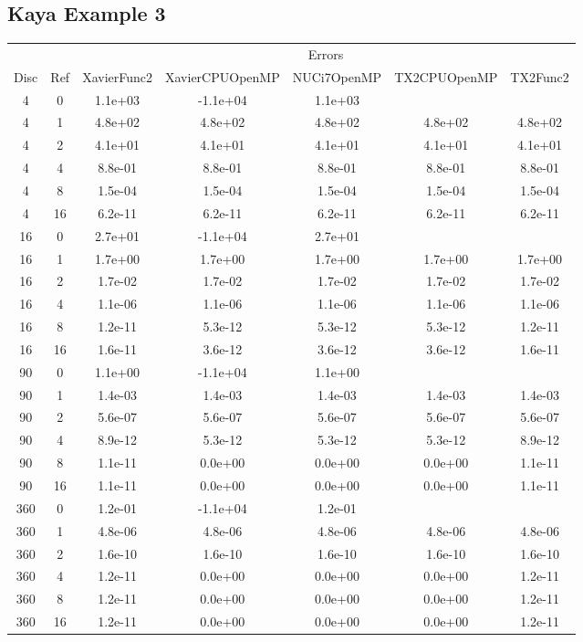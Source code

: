 \subsection{Kaya Example 3}
\begin{center}
\begin{tabular}{c|c|c|c|c|c|c}
	&&\multicolumn{5}{c}{Errors}\\
	Disc&Ref&XavierFunc2&XavierCPUOpenMP&NUCi7OpenMP&TX2CPUOpenMP&TX2Func2\\
\hline
4&0&1.1e+03&-1.1e+04&1.1e+03\\
4&1&4.8e+02&4.8e+02&4.8e+02&4.8e+02&4.8e+02\\
4&2&4.1e+01&4.1e+01&4.1e+01&4.1e+01&4.1e+01\\
4&4&8.8e-01&8.8e-01&8.8e-01&8.8e-01&8.8e-01\\
4&8&1.5e-04&1.5e-04&1.5e-04&1.5e-04&1.5e-04\\
4&16&6.2e-11&6.2e-11&6.2e-11&6.2e-11&6.2e-11\\
\hline
16&0&2.7e+01&-1.1e+04&2.7e+01\\
16&1&1.7e+00&1.7e+00&1.7e+00&1.7e+00&1.7e+00\\
16&2&1.7e-02&1.7e-02&1.7e-02&1.7e-02&1.7e-02\\
16&4&1.1e-06&1.1e-06&1.1e-06&1.1e-06&1.1e-06\\
16&8&1.2e-11&5.3e-12&5.3e-12&5.3e-12&1.2e-11\\
16&16&1.6e-11&3.6e-12&3.6e-12&3.6e-12&1.6e-11\\
\hline
90&0&1.1e+00&-1.1e+04&1.1e+00\\
90&1&1.4e-03&1.4e-03&1.4e-03&1.4e-03&1.4e-03\\
90&2&5.6e-07&5.6e-07&5.6e-07&5.6e-07&5.6e-07\\
90&4&8.9e-12&5.3e-12&5.3e-12&5.3e-12&8.9e-12\\
90&8&1.1e-11&0.0e+00&0.0e+00&0.0e+00&1.1e-11\\
90&16&1.1e-11&0.0e+00&0.0e+00&0.0e+00&1.1e-11\\
\hline
360&0&1.2e-01&-1.1e+04&1.2e-01\\
360&1&4.8e-06&4.8e-06&4.8e-06&4.8e-06&4.8e-06\\
360&2&1.6e-10&1.6e-10&1.6e-10&1.6e-10&1.6e-10\\
360&4&1.2e-11&0.0e+00&0.0e+00&0.0e+00&1.2e-11\\
360&8&1.2e-11&0.0e+00&0.0e+00&0.0e+00&1.2e-11\\
360&16&1.2e-11&0.0e+00&0.0e+00&0.0e+00&1.2e-11\\
\hline
\end{tabular}
\end{center}







